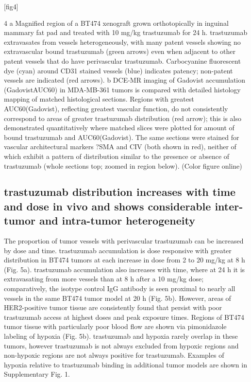 [fig4]

4
a Magnified region of a BT474 xenograft grown orthotopically in inguinal mammary fat pad and treated with 10 mg/kg trastuzumab for 24 h.
trastuzumab extravasates from vessels heterogeneously, with many patent vessels showing no extravascular bound trastuzumab (green arrows) even when adjacent to other patent vessels that do have perivascular trastuzumab.
Carbocyanine fluorescent dye (cyan) around CD31 stained vessels (blue) indicates patency; non-patent vessels are indicated (red arrows).
b DCE-MR imaging of Gadovist accumulation (GadovistAUC60) in MDA-MB-361 tumors is compared with detailed histology mapping of matched histological sections.
Regions with greatest AUC60(Gadovist), reflecting greatest vascular function, do not consistently correspond to areas of greater trastuzumab distribution (red arrow); this is also demonstrated quantitatively where matched slices were plotted for amount of bound trastuzumab and AUC60(Gadovist).
The same sections were stained for vascular architectural markers ?SMA and CIV (both shown in red), neither of which exhibit a pattern of distribution similar to the presence or absence of trastuzumab (whole sections top; zoomed in region below).
(Color figure online)


\subsection{trastuzumab distribution increases with time and dose in vivo and shows considerable inter-tumor and intra-tumor heterogeneity}

The proportion of tumor vessels with perivascular trastuzumab can be increased by dose and time.
trastuzumab accumulation is dose responsive with greater distribution in BT474 tumors at each increase in dose from 2 to 20 mg/kg at 8 h (Fig.
5a).
trastuzumab accumulation also increases with time, where at 24 h it is extravasating from more vessels than at 8 h after a 10 mg/kg dose; comparatively, the isotype control IgG antibody is seen proximal to nearly all vessels in the same BT474 tumor model at 20 h (Fig.
5b).
However, areas of HER2-positive tumor tissue are consistently found that persist with poor trastuzumab access at highest doses and peak exposure times.
Regions of BT474 tumor tissue with particularly poor blood flow are shown via pimonidazole labeling of hypoxia (Fig.
5b).
trastuzumab and hypoxia rarely overlap in these tumors, however trastuzumab is not always excluded from hypoxic regions and non-hypoxic regions are not always positive for trastuzumab.
Examples of hypoxia relative to trastuzumab binding in additional tumor models are shown in Supplementary Fig.
1.

